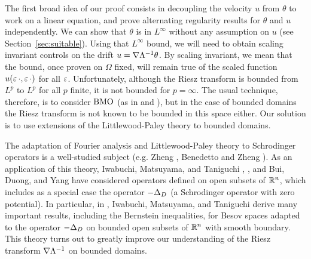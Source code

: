 \vskip0.3cm

The first broad  idea of our proof consists in decoupling the  velocity $u$ from  $\theta$ to work on  a linear equation, and prove alternating regularity results for $\theta$ and $u$ independently.  We can show that $\theta$ is in $L^\infty$ without any assumption on $u$ (see Section~\ref{sec:suitable}).  
Using that $L^\infty$ bound, we will need to obtain scaling invariant controls on the drift   $u = \nabla \Lambda^{-1} \theta$.  By scaling invariant, we mean that the bound, once proven on $\Omega$ fixed, will remain true of the scaled function $u(\varepsilon \, \cdot, \varepsilon \, \cdot)$ for all $\varepsilon$.  
Unfortunately, although the Riesz transform is bounded from $L^p$ to $L^p$ for all $p$ finite, it is not bounded for $p = \infty$.  
The usual technique, therefore, is to consider $\operatorname{BMO}$ (as in \cite{CaVa.sqg} and \cite{NoVa.qg}), but in the case of bounded domains the Riesz transform is not known to be bounded in this space either.  Our solution is to use extensions of the Littlewood-Paley theory to bounded domains. 

The adaptation of Fourier analysis and Littlewood-Paley theory to Schrodinger operators is a well-studied subject (e.g. Zheng \cite{Zh}, Benedetto and Zheng \cite{BeZh}).  As an application of this theory, Iwabuchi, Matsuyama, and Taniguchi \cite{IMT.besov}, \cite{IMT.schrodinger}, and Bui, Duong, and Yang \cite{BuDuYa} have considered operators defined on open subsets of $\mathbb{R}^n$, which includes as a special case the operator $-\Delta_D$ (a Schrodinger operator with zero potential).  In particular, in \cite{IMT.bilinear},  Iwabuchi, Matsuyama, and Taniguchi derive many important results, including the Bernstein inequalities, for Besov spaces adapted to the operator $-\Delta_D$ on bounded open subsets of $\mathbb{R}^n$ with smooth boundary.  This theory turns out to greatly improve our understanding of the Riesz transform $\nabla \Lambda^{-1}$ on bounded domains.  



